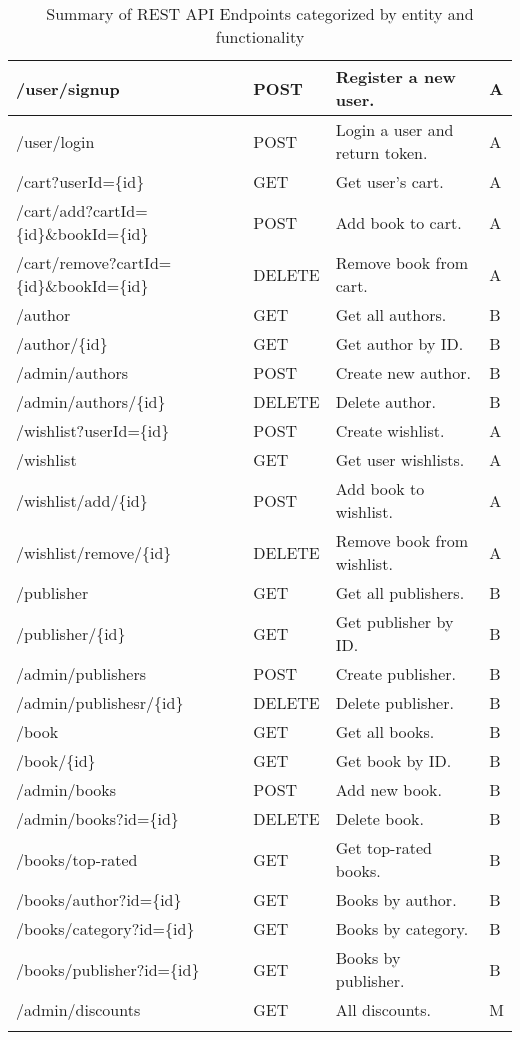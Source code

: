 \begin{longtable}{|p{}|p{} |p{}|p{}|}
    /user/signup & POST & Register a new user. & A \\
    \hline
    /user/login & POST & Login a user and return token. & A \\
    \hline
    /cart?userId=\{id\} & GET & Get user’s cart. & A \\
    \hline
    /cart/add?cartId=\{id\}\&bookId=\{id\} & POST & Add book to cart. & A \\
    \hline
    /cart/remove?cartId=\{id\}\&bookId=\{id\} & DELETE & Remove book from cart. & A \\
    \hline
    /author & GET & Get all authors. & B \\
    \hline
    /author/\{id\} & GET & Get author by ID. & B \\
    \hline
    /admin/authors & POST & Create new author. & B \\
    \hline
    /admin/authors/\{id\} & DELETE & Delete author. & B \\
    \hline
    /wishlist?userId=\{id\} & POST & Create wishlist. & A \\
    \hline
    /wishlist & GET & Get user wishlists. & A \\
    \hline
    /wishlist/add/\{id\} & POST & Add book to wishlist. & A \\
    \hline
    /wishlist/remove/\{id\} & DELETE & Remove book from wishlist. & A \\
    \hline
    /publisher & GET & Get all publishers. & B \\
    \hline
    /publisher/\{id\} & GET & Get publisher by ID. & B \\
    \hline
    /admin/publishers & POST & Create publisher. & B \\
    \hline
    /admin/publishesr/\{id\} & DELETE & Delete publisher. & B \\
    \hline
    /book & GET & Get all books. & B \\
    \hline
    /book/\{id\} & GET & Get book by ID. & B \\
    \hline
    /admin/books & POST & Add new book. & B \\
    \hline
    /admin/books?id=\{id\} & DELETE & Delete book. & B \\
    \hline
    /books/top-rated & GET & Get top-rated books. & B \\
    \hline
    /books/author?id=\{id\} & GET & Books by author. & B \\
    \hline
    /books/category?id=\{id\} & GET & Books by category. & B \\
    \hline
    /books/publisher?id=\{id\} & GET & Books by publisher. & B \\
    \hline
    /admin/discounts & GET & All discounts. & M \\
    \hline

    \caption{Summary of REST API Endpoints categorized by entity and functionality}
    \label{tab:apiSummary}
\end{longtable}
